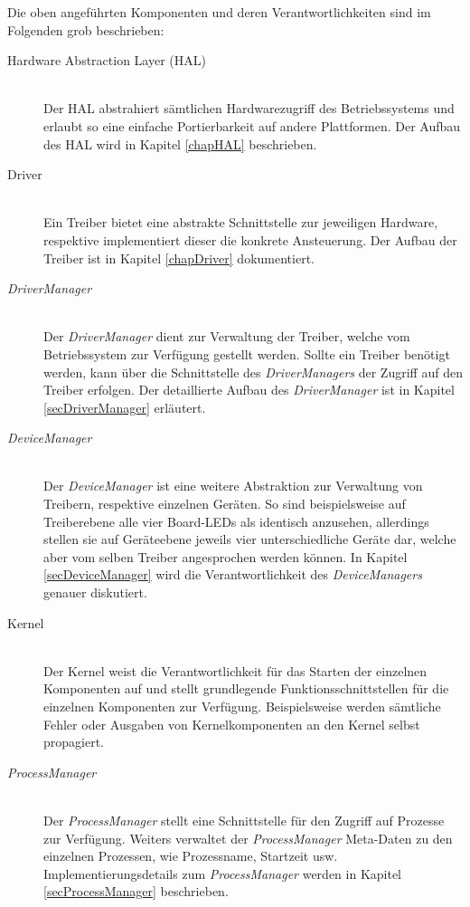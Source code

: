 Die oben angeführten Komponenten und deren Verantwortlichkeiten sind im Folgenden grob beschrieben: \\

\begin{description}
	\item[Hardware Abstraction Layer (HAL)] \hfill \\
	Der \ac{HAL} abstrahiert sämtlichen Hardwarezugriff des Betriebssystems und erlaubt so eine einfache Portierbarkeit auf andere Plattformen. Der Aufbau des \ac{HAL} wird in Kapitel \ref{chapHAL} beschrieben.
	
	\item[Driver] \hfill \\
	Ein Treiber bietet eine abstrakte Schnittstelle zur jeweiligen Hardware, respektive implementiert dieser die konkrete Ansteuerung. Der Aufbau der Treiber ist in Kapitel \ref{chapDriver} dokumentiert. 
	
	\item[\textit{DriverManager}] \hfill \\
	Der \textit{DriverManager} dient zur Verwaltung der Treiber, welche vom Betriebssystem zur Verfügung gestellt werden. Sollte ein Treiber benötigt werden, kann über die Schnittstelle des \textit{DriverManagers} der Zugriff auf den Treiber erfolgen. Der detaillierte Aufbau des \textit{DriverManager} ist in Kapitel \ref{secDriverManager} erläutert.
	
	\item[\textit{DeviceManager}] \hfill \\
	Der \textit{DeviceManager} ist eine weitere Abstraktion zur Verwaltung von Treibern, respektive einzelnen Geräten. So sind beispielsweise auf Treiberebene alle vier Board-LEDs als identisch anzusehen, allerdings stellen sie auf Geräteebene jeweils vier unterschiedliche Geräte dar, welche aber vom selben Treiber angesprochen werden können. In Kapitel \ref{secDeviceManager} wird die Verantwortlichkeit des \textit{DeviceManagers} genauer diskutiert.
	
	\item[Kernel] \hfill \\
	Der Kernel weist die Verantwortlichkeit für das Starten der einzelnen Komponenten auf und stellt grundlegende Funktionsschnittstellen für die einzelnen Komponenten zur Verfügung. Beispielsweise werden sämtliche Fehler oder Ausgaben von Kernelkomponenten an den Kernel selbst propagiert.
	
	\item[\textit{ProcessManager}] \hfill \\
	Der \textit{ProcessManager} stellt eine Schnittstelle für den Zugriff auf Prozesse zur Verfügung. Weiters verwaltet der \textit{ProcessManager} Meta-Daten zu den einzelnen Prozessen, wie Prozessname, Startzeit usw. Implementierungsdetails zum \textit{ProcessManager} werden in Kapitel \ref{secProcessManager} beschrieben.
	

\end{description}
